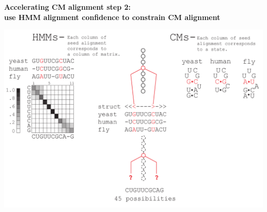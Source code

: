 \documentclass[landscape]{slides}
\begin{document}
\begin{slide}
\begin{center}

\textbf{Accelerating CM alignment step 2: \\ use HMM alignment
  confidence to constrain CM alignment}
\end{center}
\medskip
\small
\begin{center}
\includegraphics[width=8in]{figs/post_hmm_to_cm_map2_layer14}
\end{center}
\vfill
\end{slide}
\end{document}

